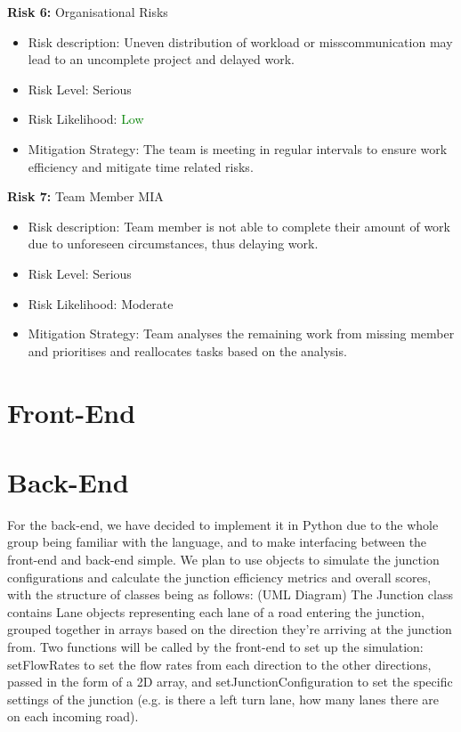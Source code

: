 \documentclass{article}
\begin{document}
\textbf{Risk 6:} Organisational Risks
\begin{itemize}
    \item Risk description: Uneven distribution of workload or misscommunication may lead to an uncomplete project and delayed work. 
    \item Risk Level: \textcolor{BurntOrange}{Serious}
    \item Risk Likelihood: \textcolor{Green}{Low}
    \item Mitigation Strategy: The team is meeting in regular intervals to ensure work efficiency and mitigate time related risks.
\end{itemize}

\textbf{Risk 7:} Team Member MIA
\begin{itemize}
    \item Risk description: Team member is not able to complete their amount of work due to unforeseen circumstances, thus delaying work. 
    \item Risk Level: \textcolor{BurntOrange}{Serious}
    \item Risk Likelihood: \textcolor{BurntOrange}{Moderate}
    \item Mitigation Strategy: Team analyses the remaining work from missing member and prioritises and reallocates tasks based on the analysis. 
\end{itemize}

\section{Front-End}

\section{Back-End}
For the back-end, we have decided to implement it in Python due to the whole group being familiar with the language, and to make 
interfacing between the front-end and back-end simple. We plan to use objects to simulate the junction configurations and calculate 
the junction efficiency metrics and overall scores, with the structure of classes being as follows:
(UML Diagram)
The Junction class contains Lane objects representing each lane of a road entering the junction, grouped together in arrays based on 
the direction they’re arriving at the junction from. Two functions will be called by the front-end to set up the simulation: 
setFlowRates to set the flow rates from each direction to the other directions, passed in the form of a 2D array, and 
setJunctionConfiguration to set the specific settings of the junction (e.g. is there a left turn lane, how many lanes there are on 
each incoming road).
\end{document}
